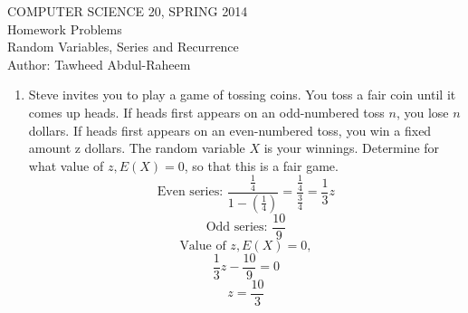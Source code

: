 \documentclass[12pt]{article}
\begin{document}
\begin{center}
COMPUTER SCIENCE 20, SPRING 2014 \\
Homework Problems\\
Random Variables, Series and Recurrence\\
Author: Tawheed Abdul-Raheem
\end{center}

\begin{enumerate}

\item Steve invites you to play a game of tossing coins. You toss a fair coin until it comes up heads. If heads first appears on an odd-numbered toss $n$, you lose $n$ dollars. If heads first appears on an even-numbered toss, you win a fixed amount z dollars. The random variable $X$ is your winnings. Determine for what value of $z, E(X) = 0$, so that this is a fair game. \\
 \[ \text{Even series: } \dfrac{\frac{1}{4}}{1 - (\frac{1}{4})} = \dfrac{\frac{1}{4}}{\frac{3}{4}} = \dfrac{1}{3}z \]
 \[ \text{Odd series: } \dfrac{10}{9} \]
 \[ \text{Value of } z, E(X) = 0,\]
 \[ \dfrac{1}{3}z - \dfrac{10}{9} = 0 \]
 \[ z = \dfrac{10}{3} \]


\end{enumerate}
\end{document}
